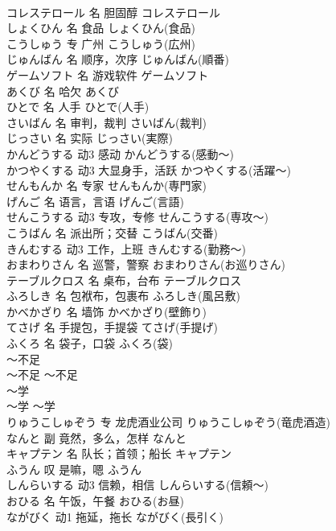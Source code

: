 \documentclass[8pt]{extreport}
\begin{document}
\begin{CJK}{UTF8}{min}
\\	コレステロール	名	胆固醇	コレステロール	
\\	しょくひん	名	食品	しょくひん(食品)	
\\	こうしゅう	专	广州	こうしゅう(広州)	
\\	じゅんばん	名	顺序，次序	じゅんばん(順番)	
\\	ゲームソフト	名	游戏软件	ゲームソフト	
\\	あくび	名	哈欠	あくび	
\\	ひとで	名	人手	ひとで(人手)	
\\	さいばん	名	审判，裁判	さいばん(裁判)	
\\	じっさい	名	实际	じっさい(実際)	
\\	かんどうする	动3	感动	かんどうする(感動～)	
\\	かつやくする	动3	大显身手，活跃	かつやくする(活躍～)	
\\	せんもんか	名	专家	せんもんか(専門家)	
\\	げんご	名	语言，言语	げんご(言語)	
\\	せんこうする	动3	专攻，专修	せんこうする(専攻～)	
\\	こうばん	名	派出所；交替	こうばん(交番)	
\\	きんむする	动3	工作，上班	きんむする(勤務～)	
\\	おまわりさん	名	巡警，警察	おまわりさん(お巡りさん)	
\\	テーブルクロス	名	桌布，台布	テーブルクロス	
\\	ふろしき	名	包袱布，包裹布	ふろしき(風呂敷)	
\\	かべかざり	名	墙饰	かべかざり(壁飾り)	
\\	てさげ	名	手提包，手提袋	てさげ(手提げ)	
\\	ふくろ	名	袋子，口袋	ふくろ(袋)	
\\	～不足	
\\	～不足	～不足	
\\	～学	
\\	～学	～学	
\\	りゅうこしゅぞう	专	龙虎酒业公司	りゅうこしゅぞう(竜虎酒造)	
\\	なんと	副	竟然，多么，怎样	なんと	
\\	キャプテン	名	队长；首领；船长	キャプテン	
\\	ふうん	叹	是嘛，嗯	ふうん	
\\	しんらいする	动3	信赖，相信	しんらいする(信頼～)	
\\	おひる	名	午饭，午餐	おひる(お昼)	
\\	ながびく	动1	拖延，拖长	ながびく(長引く)	

\end{CJK}
\end{document}

